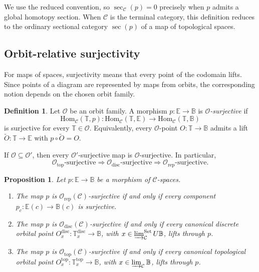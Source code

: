 \documentclass[12pt]{amsart}
\newtheorem{prop}[teo]{Proposition}
\theoremstyle{definition}
\newtheorem{defi}[teo]{Definition}
\theoremstyle{remark}
\numberwithin{figure}{section}%
\newcommand{\CC}{\mathcal{C}}
\newcommand{\T}{\mathbb{T}}
\newcommand{\Hom}{\mathrm{Hom}}
\newcommand{\Set}{\mathrm{Set}}
\newcommand{\Ee}{\mathbb{E}}
\newcommand{\Bb}{\mathbb{B}}
\begin{document}
We use the reduced convention, so $\sec_{\CC}(p)=0$ precisely when $p$
admits a global homotopy section. When $\CC$ is the terminal category,
this definition reduces to the ordinary sectional category
$\sec(p)$ of a map of topological spaces.

\subsection{Orbit-relative surjectivity}

For maps of spaces, surjectivity means that every point of the codomain
lifts. Since points of a diagram are represented by maps from orbits, the
corresponding notion depends on the chosen orbit family.

\begin{defi}\label{def:O-surjective}
Let $\mathcal O$ be an orbit family. A morphism
$p\colon\Ee\to\Bb$ is \emph{$\mathcal O$-surjective} if
\[
\Hom_{\CC}(\T,p)\colon
\Hom_{\CC}(\T,\Ee)\longrightarrow\Hom_{\CC}(\T,\Bb)
\]
is surjective for every $\T\in\mathcal O$. Equivalently, every
$\mathcal O$-point $O\colon\T\to\Bb$ admits a lift
$\widetilde O\colon\T\to\Ee$ with $p\circ\widetilde O=O$.
\end{defi}

If $\mathcal O\subseteq\mathcal O'$, then every
$\mathcal O'$-surjective map is $\mathcal O$-surjective. In particular,
\[
\mathcal O_{\mathrm{top}}\text{-surjective}
\Longrightarrow
\mathcal O_{\mathrm{disc}}\text{-surjective}
\Longrightarrow
\mathcal O_{\mathrm{rep}}\text{-surjective}.
\]

\begin{prop}
\label{prop:surjectivity-monotone-family}
\label{prop:three-surjectivities}
Let $p\colon\Ee\to\Bb$ be a morphism of $\CC$-spaces.
\begin{enumerate}
    \item The map $p$ is
    $\mathcal O_{\mathrm{rep}}(\CC)$-surjective if and only if every
    component $p_c\colon\Ee(c)\to\Bb(c)$ is surjective.

    \item The map $p$ is
    $\mathcal O_{\mathrm{disc}}(\CC)$-surjective if and only if every
    canonical discrete orbital point
    $O_x^{\mathrm{disc}}\colon\T_x^{\mathrm{disc}}\to\Bb$, with
    $x\in\varinjlim_{\CC}^{\Set}U\Bb$, lifts through $p$.

    \item The map $p$ is
    $\mathcal O_{\mathrm{top}}(\CC)$-surjective if and only if every
    canonical topological orbital point
    $O_x^{\mathrm{top}}\colon\T_x^{\mathrm{top}}\to\Bb$, with
    $x\in\varinjlim_{\CC}\Bb$, lifts through $p$.
\end{enumerate}
\end{prop}
\end{document}
